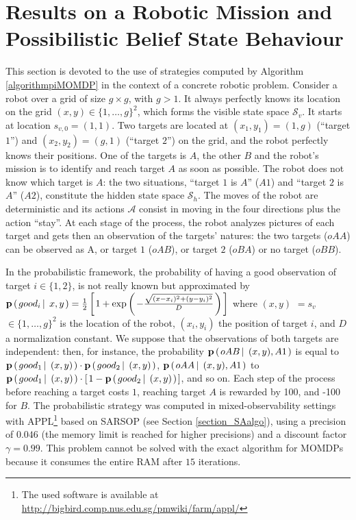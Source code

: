 \section{Results on a Robotic Mission and Possibilistic Belief State Behaviour}
\label{EXPE_CHAP1}
This section is devoted to the use of strategies computed 
by Algorithm \ref{algorithmpiMOMDP} 
in the context of a concrete robotic problem. 
Consider a robot over a grid of size $g \times g$, with $g>1$. 
It always perfectly knows its location on the grid $(x,y) \in \{ 1, \ldots, g \}^2$, 
which forms the visible state space $\mathcal{S}_v$. 
It starts at location $s_{v,0}=(1,1)$.
Two targets are located at $(x_1,y_1)=(1,g)$ (``target $1$'') 
and $(x_2,y_2)=(g,1)$ (``target $2$'') on the grid, 
and the robot perfectly knows their positions. 
One of the targets is $A$, the other $B$ 
and the robot's mission is to identify and reach target $A$ 
as soon as possible. 
The robot does not know which target is $A$: 
the two situations, ``target $1$ is $A$'' ($A1$) 
and ``target $2$ is $A$'' ($A2$), 
constitute the hidden state space $\mathcal{S}_h$. 
The moves of the robot are deterministic 
and its actions $\mathcal{A}$ 
consist in moving in the four directions plus the action ``stay''.
At each stage of the process, 
the robot analyzes pictures of each target 
and gets then an observation of the targets' natures: 
the two targets ($oAA$) can be observed as A, 
or target $1$ ($oAB$), or target $2$ ($oBA$) or no target ($oBB$).

In the probabilistic framework, 
the probability of having a good observation of target $i \in \{ 1,2 \}$, 
is not really known but approximated by 
$\textbf{p} \left( \left.  good_i \, \right| \left. \, x,y  \right. \right) 
= \frac{1}{2} \left[ \left.  1 + \exp \left( \left.  -\frac{\sqrt{(x-x_i)^2+(y-y_i)^2}}{D}  \right. \right)  \right. \right]$ 
where $(x,y)$ $=s_v$ $\in \{ 1,\ldots,g \}^2 $
is the location of the robot, 
$(x_i,y_i)$ the position of target $i$, 
and $D$ a normalization constant. 
We suppose that the observations 
of both targets are independent:
then, for instance, the probability 
$\textbf{p} \left( \left.  oAB \, \right| \left. \, (x,y), A1  \right. \right)$ is equal to 
$\textbf{p} \left( \left.  good_1 \, \right| \left. \, (x,y) \right. \right) 
\cdot \textbf{p} \left( \left.  good_2 \, \right| \left. \, (x,y)  \right. \right)$, 
$\textbf{p} \left( \left.  oAA \, \right| \left. \, (x,y), A1  \right. \right)$ 
to $\textbf{p}\left( \left.  good_1 \, \right| \left. \, (x,y) \right. \right) 
\cdot \left[ \left.  1 - \textbf{p} \left( \left.  good_2 \, \right| \left. \, (x,y)  \right. \right)  \right. \right] $, 
and so on. 
Each step of the process before reaching a target costs $1$, 
reaching target $A$ is rewarded by 100, 
and -100 for $B$. 
The probabilistic strategy was computed 
in mixed-observability settings with APPL\footnote{The used software is available at \url{http://bigbird.comp.nus.edu.sg/pmwiki/farm/appl/}} 
based on SARSOP \cite{OngShaoHsuWee-IJRR10,Kurniawati-RSS08}
(see Section \ref{section_SAalgo}), 
using a precision of $0.046$ 
(the memory limit is reached for higher precisions) 
and a discount factor $\gamma=0.99$. 
This problem cannot be solved 
with the exact algorithm for MOMDPs \cite{AraThoBufCha-ICTAI10} 
because it consumes the entire RAM after $15$ iterations.

